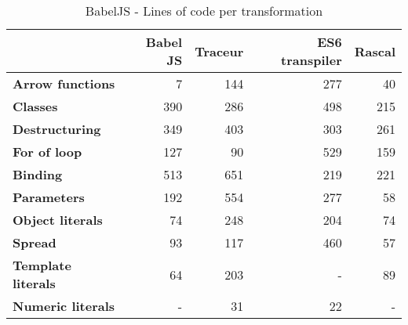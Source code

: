 \begin{table}
\caption{BabelJS - Lines of code per transformation}
\begin{tabular}{@{}lrrrr@{}}
\toprule
                           & \textbf{Babel JS} & \textbf{Traceur} & \textbf{ES6 transpiler} & \textbf{Rascal} \\ \midrule
\textbf{Arrow functions}   & 7                 & 144              & 277\footnotemark[2]     & 40 \\
\textbf{Classes}           & 390               & 286              & 498                     & 215 \\
\textbf{Destructuring}     & 349               & 403              & 303                     & 261 \\
\textbf{For of loop}       & 127               & 90               & 529                     & 159 \\
\textbf{Binding}           & 513               & 651              & 219                     & 221 \\
\textbf{Parameters}        & 192               & 554              & 277\footnotemark[2]     & 58 \\
\textbf{Object literals}   & 74                & 248              & 204                     & 74 \\
\textbf{Spread}            & 93                & 117              & 460                     & 57 \\
\textbf{Template literals} & 64                & 203              & -\footnotemark          & 89 \\
\textbf{Numeric literals}  & -                 & 31               & 22                      & - \\ \bottomrule
\end{tabular}
\end{table}


